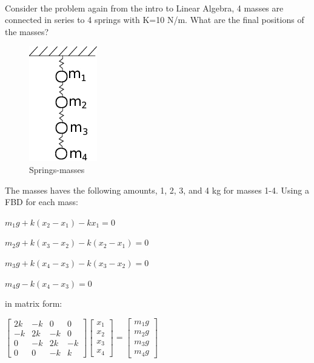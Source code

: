 \documentclass[11pt]{article}
\makeatletter
\def\maxwidth{\ifdim\Gin@nat@width>\linewidth\linewidth
    \else\Gin@nat@width\fi}
\let\Oldincludegraphics\includegraphics
\renewcommand{\includegraphics}[1]{\Oldincludegraphics[width=.8\maxwidth]{#1}}
\makeatother
\begin{document}
    \begin{center}
    \end{center}
    { \hspace*{\fill} \\}
    
    Consider the problem again from the intro to Linear Algebra, 4 masses
are connected in series to 4 springs with K=10 N/m. What are the final
positions of the masses?

\begin{figure}[htbp]
\centering
\includegraphics{../lecture_09/mass_springs.png}
\caption{Springs-masses}
\end{figure}

The masses haves the following amounts, 1, 2, 3, and 4 kg for masses
1-4. Using a FBD for each mass:

\(m_{1}g+k(x_{2}-x_{1})-kx_{1}=0\)

\(m_{2}g+k(x_{3}-x_{2})-k(x_{2}-x_{1})=0\)

\(m_{3}g+k(x_{4}-x_{3})-k(x_{3}-x_{2})=0\)

\(m_{4}g-k(x_{4}-x_{3})=0\)

in matrix form:

\(\left[ \begin{array}{cccc} 2k & -k & 0 & 0 \\ -k & 2k & -k & 0 \\ 0 & -k & 2k & -k \\ 0 & 0 & -k & k \end{array} \right] \left[ \begin{array}{c} x_{1} \\ x_{2} \\ x_{3} \\ x_{4} \end{array} \right]= \left[ \begin{array}{c} m_{1}g \\ m_{2}g \\ m_{3}g \\ m_{4}g \end{array} \right]\)
\end{document}
